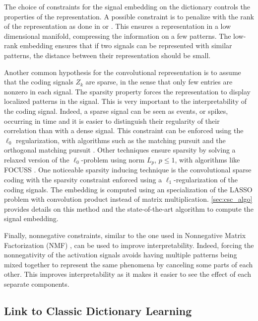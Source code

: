 \documentclass[../thesis.tex]{subfiles}
\begin{document}
	The choice of constraints for the signal embedding on the dictionary
	controls the properties of the representation. A possible constraint is 
	to penalize with the rank of the representation as done in \citet{Liu2010} or
	\citet{Candes2011}. This ensures a representation in a low dimensional manifold,
	compressing the information on a few patterns. The low-rank
	embedding ensures that if two signals can be represented with similar patterns,
    the distance between their representation should be small.
    
    Another common hypothesis for the convolutional representation is to assume
    that the coding signals $Z_k$ are sparse, in the sense that only few entries are
    nonzero in each signal. The sparsity property forces the representation to display
    localized patterns in the signal. This is very important to the interpretability of
    the coding signal. Indeed, a sparse signal can be seen as events, or spikes, occurring in
    time and it is easier to distinguish their regularity of their correlation than with
    a dense signal. This constraint can be enforced using the $\ell_0$
    regularization, with algorithms such as the matching pursuit \citep{Mallat1993} and
    the orthogonal matching pursuit \citep{Pati1993}. Other techniques ensure sparsity
    by solving a relaxed version of the $\ell_0$-problem using norm $L_p$, $p \le 1$,
    with algorithms like FOCUSS \citep{Gorodnitsky1997}.
    One noticeable sparsity inducing technique is the convolutional sparse coding with the
    sparsity constraint enforced using a $\ell_1$-regularization of the coding signals.
    The embedding is computed using an specialization of the LASSO problem with convolution
    product instead of matrix multiplication.
	\autoref{sec:csc_algo} provides details on this method and the state-of-the-art algorithm
	to compute the signal embedding.

	Finally, nonnegative constraints, similar to the one used in  Nonnegative Matrix
	Factorization (NMF) \citep{Gillis2011}, can be used to improve interpretability.
	Indeed, forcing the nonnegativity of the activation signals avoids having multiple
	patterns being mixed together to represent the same phenomena by canceling some
	parts of each other. This improves interpretability as it makes it easier to see
	the effect of each separate components.



\subsection{Link to Classic Dictionary Learning}
\label{sub:link_dl}
\end{document}
